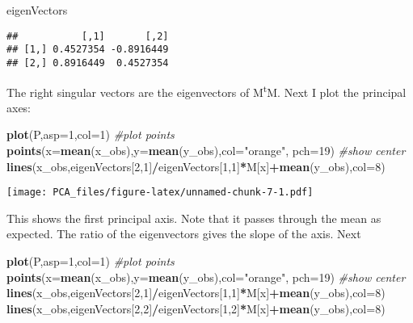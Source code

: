 \documentclass[]{article}
\newenvironment{Shaded}{\begin{snugshade}}{\end{snugshade}}
\newcommand{\KeywordTok}[1]{\textcolor[rgb]{0.13,0.29,0.53}{\textbf{#1}}}
\newcommand{\DataTypeTok}[1]{\textcolor[rgb]{0.13,0.29,0.53}{#1}}
\newcommand{\DecValTok}[1]{\textcolor[rgb]{0.00,0.00,0.81}{#1}}
\newcommand{\StringTok}[1]{\textcolor[rgb]{0.31,0.60,0.02}{#1}}
\newcommand{\CommentTok}[1]{\textcolor[rgb]{0.56,0.35,0.01}{\textit{#1}}}
\newcommand{\OperatorTok}[1]{\textcolor[rgb]{0.81,0.36,0.00}{\textbf{#1}}}
\newcommand{\NormalTok}[1]{#1}
\begin{document}
\begin{Shaded}
\begin{Highlighting}[]
\NormalTok{eigenVectors}
\end{Highlighting}
\end{Shaded}

\begin{verbatim}
##           [,1]       [,2]
## [1,] 0.4527354 -0.8916449
## [2,] 0.8916449  0.4527354
\end{verbatim}

The right singular vectors are the eigenvectors of
M\textsuperscript{t}M. Next I plot the principal axes:

\begin{Shaded}
\begin{Highlighting}[]
\KeywordTok{plot}\NormalTok{(P,}\DataTypeTok{asp=}\DecValTok{1}\NormalTok{,}\DataTypeTok{col=}\DecValTok{1}\NormalTok{) }\CommentTok{#plot points}
\KeywordTok{points}\NormalTok{(}\DataTypeTok{x=}\KeywordTok{mean}\NormalTok{(x_obs),}\DataTypeTok{y=}\KeywordTok{mean}\NormalTok{(y_obs),}\DataTypeTok{col=}\StringTok{"orange"}\NormalTok{, }\DataTypeTok{pch=}\DecValTok{19}\NormalTok{) }\CommentTok{#show center}
\KeywordTok{lines}\NormalTok{(x_obs,eigenVectors[}\DecValTok{2}\NormalTok{,}\DecValTok{1}\NormalTok{]}\OperatorTok{/}\NormalTok{eigenVectors[}\DecValTok{1}\NormalTok{,}\DecValTok{1}\NormalTok{]}\OperatorTok{*}\NormalTok{M[x]}\OperatorTok{+}\KeywordTok{mean}\NormalTok{(y_obs),}\DataTypeTok{col=}\DecValTok{8}\NormalTok{)}
\end{Highlighting}
\end{Shaded}

\texttt{[image: PCA\_files/figure-latex/unnamed-chunk-7-1.pdf]}

This shows the first principal axis. Note that it passes through the
mean as expected. The ratio of the eigenvectors gives the slope of the
axis. Next

\begin{Shaded}
\begin{Highlighting}[]
\KeywordTok{plot}\NormalTok{(P,}\DataTypeTok{asp=}\DecValTok{1}\NormalTok{,}\DataTypeTok{col=}\DecValTok{1}\NormalTok{) }\CommentTok{#plot points}
\KeywordTok{points}\NormalTok{(}\DataTypeTok{x=}\KeywordTok{mean}\NormalTok{(x_obs),}\DataTypeTok{y=}\KeywordTok{mean}\NormalTok{(y_obs),}\DataTypeTok{col=}\StringTok{"orange"}\NormalTok{, }\DataTypeTok{pch=}\DecValTok{19}\NormalTok{) }\CommentTok{#show center}
\KeywordTok{lines}\NormalTok{(x_obs,eigenVectors[}\DecValTok{2}\NormalTok{,}\DecValTok{1}\NormalTok{]}\OperatorTok{/}\NormalTok{eigenVectors[}\DecValTok{1}\NormalTok{,}\DecValTok{1}\NormalTok{]}\OperatorTok{*}\NormalTok{M[x]}\OperatorTok{+}\KeywordTok{mean}\NormalTok{(y_obs),}\DataTypeTok{col=}\DecValTok{8}\NormalTok{)}
\KeywordTok{lines}\NormalTok{(x_obs,eigenVectors[}\DecValTok{2}\NormalTok{,}\DecValTok{2}\NormalTok{]}\OperatorTok{/}\NormalTok{eigenVectors[}\DecValTok{1}\NormalTok{,}\DecValTok{2}\NormalTok{]}\OperatorTok{*}\NormalTok{M[x]}\OperatorTok{+}\KeywordTok{mean}\NormalTok{(y_obs),}\DataTypeTok{col=}\DecValTok{8}\NormalTok{)}
\end{Highlighting}
\end{Shaded}
\end{document}
